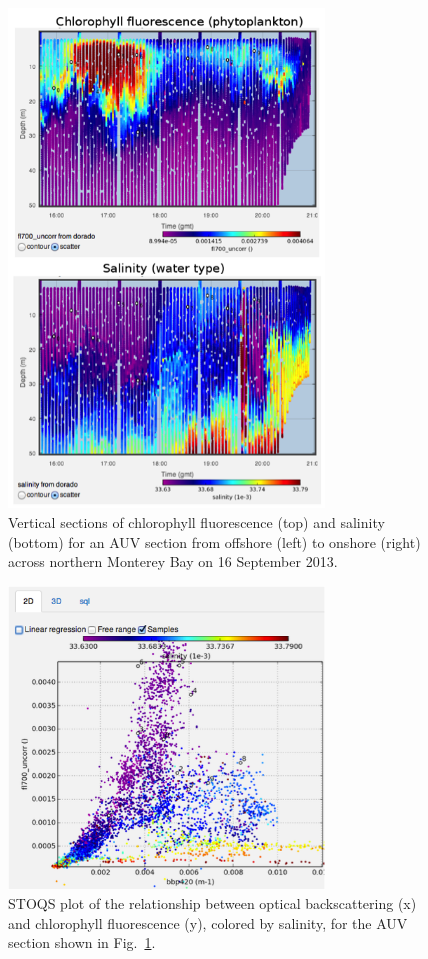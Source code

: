 \documentclass[conference]{IEEEtran}
\begin{document}
\begin{figure}[htpb]
\centering
\includegraphics[width=3.3in]{JohnsFigureY.png}
\caption{Vertical sections of chlorophyll fluorescence (top) and salinity (bottom) for an AUV section from offshore (left) to onshore (right) across northern Monterey Bay on 16 September 2013.}
\label{fig:JohnsFigureY}
\end{figure}

\begin{figure}[htpb]
\centering
\includegraphics[width=3.3in]{JohnsFigureZ.png}
\caption{STOQS plot of the relationship between optical backscattering (x) and chlorophyll fluorescence (y), colored by salinity, for the AUV section shown in Fig.~\ref{fig:JohnsFigureY}.}
\label{fig:JohnsFigureZ}
\end{figure}
\end{document}
